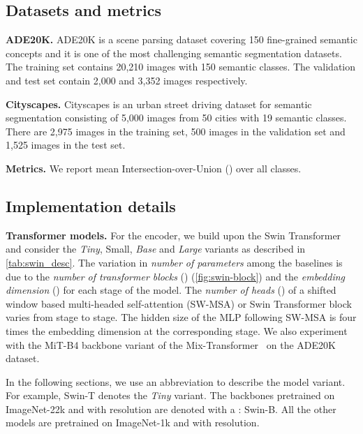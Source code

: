 \documentclass[10pt,twocolumn,letterpaper]{article}
\begin{document}
\subsection{Datasets and metrics}

\noindent 
\textbf{ADE20K.} \cite{ade20k} ADE20K is a scene parsing dataset covering 150 fine-grained semantic concepts and it is one of the most challenging semantic segmentation datasets. The training set contains 20,210 images with 150 semantic classes. The validation and test set contain 2,000 and 3,352 images respectively.

\noindent
\textbf{Cityscapes.} \cite{cityscapes} Cityscapes is an urban street driving dataset for semantic segmentation consisting of 5,000 images from 50 cities with 19 semantic classes. There are 2,975 images in the training set, 500 images in the validation set and 1,525 images in the test set.

\noindent 
\textbf{Metrics.} We report mean Intersection-over-Union () over all classes.

\subsection{Implementation details}

\noindent \textbf{Transformer models.} For the encoder, we build upon the Swin Transformer \cite{swin-T} and consider the \textit{Tiny}, Small, \textit{Base} and \textit{Large} variants as described in \cref{tab:swin_desc}. The variation in \textit{number of parameters} among the baselines is due to the \textit{number of transformer blocks} () (\cref{fig:swin-block}) and the \textit{embedding dimension} () for each stage of the model. The \textit{number of heads} () of a shifted window based multi-headed self-attention (SW-MSA) or Swin Transformer block varies from stage to stage. The hidden size of the MLP following SW-MSA is four times the embedding dimension at the corresponding stage. We also experiment with the MiT-B4 backbone variant of the Mix-Transformer~\cite{segformer} on the ADE20K~\cite{ade20k} dataset.

In the following sections, we use an abbreviation to describe the model variant. For example, Swin-T denotes the \textit{Tiny} variant. The backbones pretrained on ImageNet-22k \cite{imagenet} and with  resolution are denoted with a \dag: Swin-B. All the other models are pretrained on ImageNet-1k and with  resolution.
\end{document}
